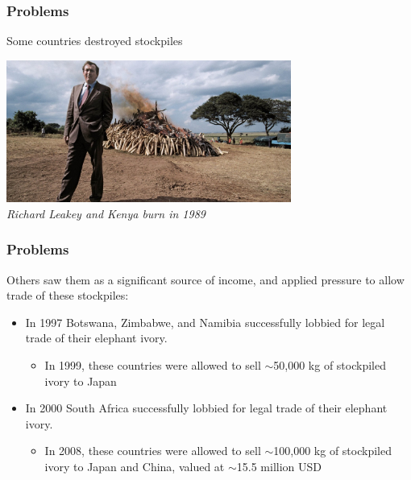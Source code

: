 \documentclass[10pt]{beamer}
\begin{document}
\begin{frame}[t]
\frametitle{Problems}
\vspace{0.5cm}

	Some countries destroyed stockpiles\\
	
	\vspace{0.5cm}
		
	\begin{center}
		\includegraphics[width=0.70\textwidth]{figures/leakey1.jpg}\\
		\footnotesize{\emph{Richard Leakey and Kenya burn in 1989}}

	\end{center}
\end{frame}


\begin{frame}[t]
\frametitle{Problems}
\vspace{0.5cm}

	Others saw them as a significant source of income, and applied pressure to allow trade of these stockpiles:
	
		\bigskip
		
		\begin{itemize}
			\item In 1997 Botswana, Zimbabwe, and Namibia successfully lobbied for legal trade of their elephant ivory.
			\smallskip
				\begin{itemize}
					\item In 1999, these countries were allowed to sell $\sim$50,000 kg of stockpiled ivory to Japan
				\end{itemize}
			\bigskip
			\item In 2000 South Africa successfully lobbied for legal trade of their elephant ivory.
			\smallskip
				\begin{itemize}
					\item In 2008, these countries were allowed to sell $\sim$100,000 kg of stockpiled ivory to Japan and China, valued at $\sim$15.5 million USD
				\end{itemize}
		\end{itemize}
		
\end{frame}
\end{document}

